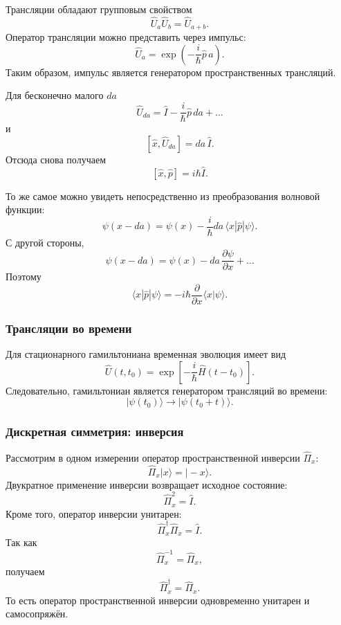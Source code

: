 \documentclass[12pt,a4paper]{article}
\begin{document}
Трансляции обладают групповым свойством
\[
    \boxed{
        \hat U_a\hat U_b
        =
        \hat U_{a+b}
    }.
\]
Оператор трансляции можно представить через импульс:
\[
    \boxed{
        \hat U_a
        =
        \exp\left(
            -\frac{i}{\hbar}\hat p\,a
        \right)
    }.
\]
Таким образом, импульс является генератором пространственных
трансляций.

Для бесконечно малого $da$
\[
    \hat U_{da}
    =
    \hat I
    -
    \frac{i}{\hbar}\hat p\,da
    +
    \ldots
\]
и
\[
    [\hat x,\hat U_{da}]
    =
    da\,\hat I.
\]
Отсюда снова получаем
\[
    \boxed{
        [\hat x,\hat p]
        =
        i\hbar\hat I
    }.
\]

То же самое можно увидеть непосредственно из преобразования волновой
функции:
\[
    \psi(x-da)
    =
    \psi(x)
    -
    \frac{i}{\hbar}
    da\,
    \langle x|\hat p|\psi\rangle.
\]
С другой стороны,
\[
    \psi(x-da)
    =
    \psi(x)-da\,\frac{\partial\psi}{\partial x}+\ldots
\]
Поэтому
\[
    \boxed{
        \langle x|\hat p|\psi\rangle
        =
        -i\hbar
        \frac{\partial}{\partial x}
        \langle x|\psi\rangle
    }.
\]


\subsubsection{Трансляции во времени}

Для стационарного гамильтониана временная эволюция имеет вид
\[
    \boxed{
        \hat U(t,t_0)
        =
        \exp\left[
            -\frac{i}{\hbar}
            \hat H(t-t_0)
        \right]
    }.
\]
Следовательно, гамильтониан является генератором трансляций во времени:
\[
    |\psi(t_0)\rangle
    \longrightarrow
    |\psi(t_0+t)\rangle.
\]


\subsubsection{Дискретная симметрия: инверсия}

Рассмотрим в одном измерении оператор пространственной инверсии
$\hat\Pi_x$:
\[
    \boxed{
        \hat\Pi_x|x\rangle
        =
        |-x\rangle
    }.
\]
Двукратное применение инверсии возвращает исходное состояние:
\[
    \boxed{
        \hat\Pi_x^2=\hat I
    }.
\]
Кроме того, оператор инверсии унитарен:
\[
    \hat\Pi_x^\dagger\hat\Pi_x=\hat I.
\]
Так как
\[
    \hat\Pi_x^{-1}=\hat\Pi_x,
\]
получаем
\[
    \boxed{
        \hat\Pi_x^\dagger
        =
        \hat\Pi_x
    }.
\]
То есть оператор пространственной инверсии одновременно унитарен и
самосопряжён.
\end{document}
